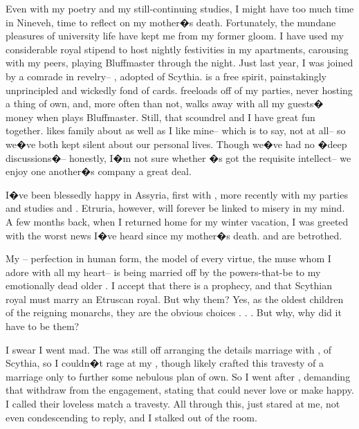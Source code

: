 \documentclass[char]{Kos}
\begin{document}
Even with my poetry and my still-continuing studies, I might have too much time in Nineveh, time to reflect on my mother�s death. Fortunately, the mundane pleasures of university life have kept me from my former gloom. I have used my considerable royal stipend to host nightly festivities in my apartments, carousing with my peers, playing Bluffmaster through the night. Just last year, I was joined by a comrade in revelry-- \cWard{\name}, adopted \cWard{\prince} of Scythia. \cWard{\nickname} is a free spirit, painstakingly unprincipled and wickedly fond of cards. \cWard{\They} freeloads off of my parties, never hosting a thing of \cWard{\their} own, and, more often than not, \cWard{\they} walks away with all my guests� money when \cWard{\they} plays Bluffmaster. Still, that scoundrel and I have great fun together. \cWard{\nickname} likes \cWard{\their} family about as well as I like mine-- which is to say, not at all-- so we�ve both kept silent about our personal lives. Though we�ve had no �deep discussions�-- honestly, I�m not sure whether \cWard{\they}�s got the requisite intellect-- we enjoy one another�s company a great deal.

I�ve been blessedly happy in Assyria, first with \cBride{\nickname}, more recently with my parties and studies and \cWard{\nickname}. Etruria, however, will forever be linked to misery in my mind. A few months back, when I returned home for my winter vacation, I was greeted with the worst news I�ve heard since my mother�s death. \cBride{\nickname} and \cGroom{\nickname} are betrothed.

My \cBride{\nickname}-- perfection in human form, the model of every virtue, the muse whom I adore with all my heart-- is being married off by the powers-that-be to my emotionally dead older \cGroom{\sibling}. I accept that there is a prophecy, and that Scythian royal must marry an Etruscan royal. But why them? Yes, as the oldest children of the reigning monarchs, they are the obvious choices . . . But why, why did it have to be them? 

I swear I went mad. The \cEtruriaKing{\monarch} was still off arranging the details marriage with \cScythiaKing{\name}, \cScythiaKing{\monarch} of Scythia, so I couldn�t rage at my \cEtruriaKing{\parent}, though \cEtruriaKing{\they} likely crafted this travesty of a marriage only to further some nebulous plan of \cScythiaKing{\their} own. So I went after \cGroom{\nickname}, demanding that \cGroom{\they} withdraw from the engagement, stating that \cGroom{\they} could never love \cBride{\nickname} or make \cBride{\them} happy. I called their loveless match a travesty. All through this, \cGroom{\they} just stared at me, not even condescending to reply, and I stalked out of the room.
\end{document}
